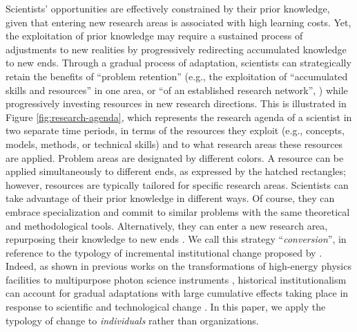 \documentclass{article}
\begin{document}
Scientists' opportunities are effectively constrained by their prior knowledge, given that entering new research areas is associated with high learning costs. Yet, the exploitation of prior knowledge may require a sustained process of adjustments to new realities by progressively redirecting accumulated knowledge to new ends. Through a gradual process of adaptation, scientists can strategically retain  the benefits of ``problem retention'' (e.g., the exploitation of ``accumulated skills and resources'' in one area, or ``of an established research network'', \citealt[p.~106]{Gieryn1978}) while progressively investing resources in new research directions. %
This is illustrated in Figure \ref{fig:research-agenda}, %
which represents the research agenda of a scientist in two separate time periods, in terms of the resources they exploit (e.g., concepts, models, methods, or technical skills) and to what research areas these resources are applied. Problem areas are designated by different colors. A resource can be applied simultaneously to different ends, as expressed by the hatched rectangles; however, resources are typically tailored for specific research areas. Scientists can take advantage of their prior knowledge in different ways. Of course, they can embrace specialization and commit to similar problems with the same theoretical and methodological tools.  
Alternatively, they can enter a new research area, repurposing their knowledge to new ends \citep{Mulkay1974,schon1963displacement}. We call this strategy ``\textit{conversion}'', in reference to the typology of incremental institutional change proposed by \citet{mahoney_thelen_2009}. Indeed, as shown in previous works on the transformations of high-energy physics facilities to multipurpose photon science instruments \citep{Hallonsten2013,Heinze2017a}, historical institutionalism can account for gradual adaptations with large cumulative effects taking place in response to scientific and technological change \citep{Heinze2012}. In this paper, we apply the typology of change to \textit{individuals} rather than organizations. 
\end{document}
